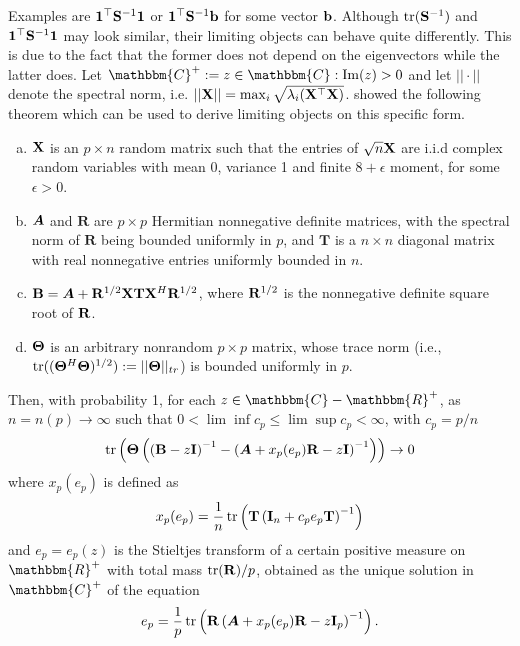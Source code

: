 \documentclass[12pt, twoside]{book}\usepackage{knitr}
\begin{document}
Examples are $\mathbf{1}^\top \mathbf{S}^{-1} \mathbf{1}$ or $\mathbf{1}^\top \mathbf{S}^{-1} \mathbf{b}$ for some vector $\mathbf{b}$. 
Although $\operatorname{tr}(\mathbf{S}^{-1})$ and $\mathbf{1}^\top \mathbf{S}^{-1} \mathbf{1}$ may look similar, their limiting objects can behave quite differently. 
This is due to the fact that the former does not depend on the eigenvectors while the latter does.
Let $\mathbbm{C}^+ := {z \in \mathbbm{C}: \operatorname{Im}(z)>0}$ and let $||\cdot||$ denote the spectral norm, i.e. $|| \mathbf{X} || =\max_i \sqrt{\lambda_{i}(\mathbf{X}^\top \mathbf{X})}$.
\citet{rubio2011spectral} showed the following theorem which can be used to derive limiting objects on this specific form.
\begin{theorem}\label{thm:rubio}\hfill\break
\begin{enumerate}[(a)]
  \item \label{enum:1} $\mathbf{X}$ is an $p \times n$ random matrix such that the entries of $\sqrt{n}\mathbf{X}$ are i.i.d complex random variables with mean 0, variance 1 and finite $8+\epsilon$ moment, for some $\epsilon > 0$.
  \item \label{enum:2} $\mbox{\boldmath$A$}$ and $\mathbf{R}$ are $p \times p$ Hermitian nonnegative definite matrices, with the spectral norm of $\mathbf{R}$ being bounded uniformly in $p$, and $\mathbf{T}$ is a $n \times n$ diagonal matrix with real nonnegative entries uniformly bounded in $n$.
  \item \label{enum:3} $\mathbf{B}=\mbox{\boldmath$A$} + \mathbf{R}^{1/2} \mathbf{X} \mathbf{T} \mathbf{X}^H \mathbf{R}^{1/2}$, where $\mathbf{R}^{1/2}$ is the nonnegative definite square root of $\mathbf{R}$.
  \item \label{enum:4} $\mathbf{\Theta}$ is an arbitrary nonrandom $p \times p$ matrix, whose trace norm (i.e., $\operatorname{tr}((\mathbf{\Theta}^H \mathbf{\Theta})^{1/2}):=||\mathbf{\Theta}||_{tr}$) is bounded uniformly in $p$.
\end{enumerate}

Then, with probability 1, for each $z\in \mathbbm{C}-\mathbbm{R}^+$, as $n=n(p) \rightarrow \infty$ such that $0<\lim\inf c_p \leq \lim \sup c_p < \infty$, with $c_p = p/n$
\begin{equation}
  \operatorname{tr}\left(\mathbf{\Theta}\left( \left(\mathbf{B} - z\mathbf{I}\right)^{-1} - \left( \mbox{\boldmath$A$} + x_p(e_p)\mathbf{R} - z\mathbf{I} \right)^{-1} \right) \right) \rightarrow 0
\end{equation}
where $x_p(e_p)$ is defined as
\begin{equation}
  x_p(e_p) = \frac{1}{n}\operatorname{tr} \left( \mathbf{T} \left(\mathbf{I}_n + c_p e_p \mathbf{T} \right)^{-1} \right)
\end{equation}
and $e_p=e_p(z)$ is the Stieltjes transform of a certain positive measure on $\mathbbm{R}^+$ with total mass $\operatorname{tr}(\mathbf{R})/p$, obtained as the unique solution in $\mathbbm{C}^+$ of the equation
\begin{equation}
  e_p = \frac{1}{p}\operatorname{tr} \left( \mathbf{R} \left(\mbox{\boldmath$A$} +  x_p(e_p) \mathbf{R} - z\mathbf{I}_p \right)^{-1} \right).
\end{equation}
\end{theorem}
\end{document}
